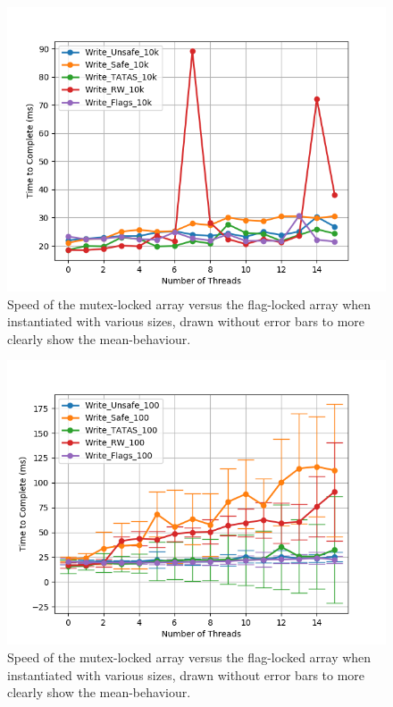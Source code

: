 \documentclass[11pt]{article}
\begin{document}
\begin{figure}\label{fig:step7_2}
\centering
\includegraphics[scale=0.65]{step7_2.png}
\caption{Speed of the mutex-locked array versus the flag-locked array when instantiated with various sizes, drawn without error bars to more clearly show the mean-behaviour.}
\end{figure}

\begin{figure}\label{fig:step7_3}
\centering
\includegraphics[scale=0.65]{step7_3.png}
\caption{Speed of the mutex-locked array versus the flag-locked array when instantiated with various sizes, drawn without error bars to more clearly show the mean-behaviour.}
\end{figure}
\end{document}
